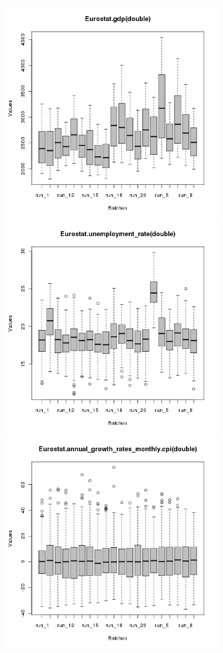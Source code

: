 \begin{figure}[ht!]
\centering\leavevmode
\begin{minipage}{17cm}
\centering\leavevmode
\includegraphics[width=8cm]{./batch/tax_0.08/Eurostat-gdp-runbatch.png}
\includegraphics[width=8cm]{./batch/tax_0.08/Eurostat-unemployment_rate-runbatch.png}\\
\includegraphics[width=8cm]{./batch/tax_0.08/Eurostat-cpi-runbatch.png}

\end{minipage}
\end{figure}
